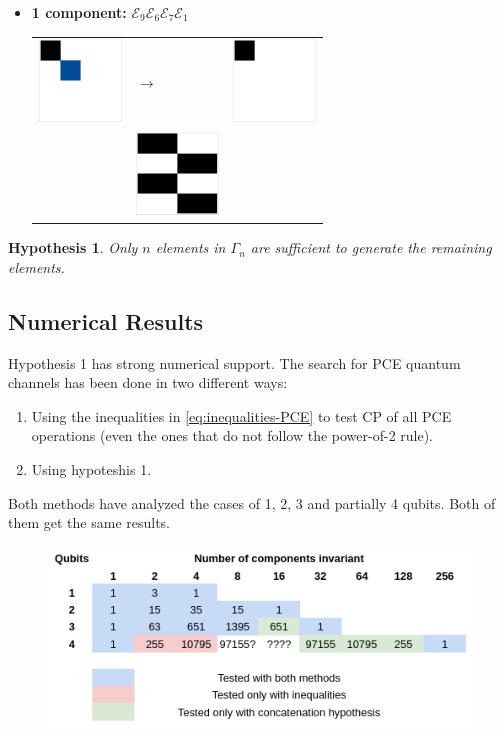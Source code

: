 \documentclass[11pt,dvipsnames]{article} %
\newtheorem{conj}{Hypothesis}
\newcommand{\E}{\mathcal{E}}
\newcommand{\1}{\mathds{1}}
\begin{document}
\begin{itemize}
\pagebreak
\item \textbf{1 component:} $\E_9\E_6\E_7\E_1$\newline
\begin{tabular}{m{2cm} m{2cm} m{2cm}}
\includegraphics[width=2.2cm]{C22}
& \hspace{0.8cm}$\longrightarrow$ 
& \includegraphics[width=2.2cm]{depolarizing} \\ 
 & \includegraphics[width=2.2cm]{img-JA/otro} &  \\ 
\end{tabular}
\end{itemize}

\begin{conj}
Only $n$ elements in $\Gamma_n$ are sufficient to generate the 
remaining elements.
\end{conj}
\subsection*{Numerical Results} %
Hypothesis 1 has strong numerical support. The search for PCE quantum
channels has been done in two different ways:
\begin{enumerate}
\item Using the inequalities in \eqref{eq:inequalities-PCE} to test CP of 
all PCE operations (even the ones that do not follow the power-of-2 rule).
\item Using hypoteshis 1.
\end{enumerate}
Both methods have analyzed the cases of 1, 2, 3 and partially 4 qubits. 
Both of them get the same results. 

\begin{figure}[H]
  \centering
  \includegraphics[width=.6\textwidth]{cuadro}
\end{figure}
\end{document}
